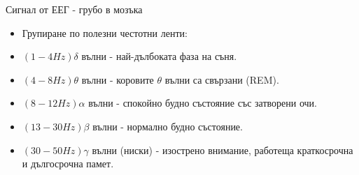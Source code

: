 \documentclass[9pt]{beamer}
\begin{document}
    \begin{frame}[t]{Сигнал от ЕЕГ - грубо в мозъка}
        \begin{itemize}
            \setlength\itemsep{\fill}
            \pause
            \item Групиране по полезни честотни ленти:
            \pause
            \item $(1-4Hz) \delta$ вълни
            \pause
             - най-дълбоката фаза на съня.
            \pause
            \item $(4-8Hz) \theta$ вълни
            \pause
             - коровите $\theta$ вълни са свързани (REM).
            \pause
            \item $(8-12Hz) \alpha$ вълни
            \pause
             - спокойно будно състояние със затворени очи.
            \pause
            \item $(13-30Hz) \beta$ вълни
            \pause
             - нормално будно състояние.
            \item $(30-50Hz)\gamma$ вълни (ниски)
            \pause
             - изострено внимание, работеща краткосрочна и дългосрочна памет.
        \end{itemize}
    \end{frame}
\end{document}
